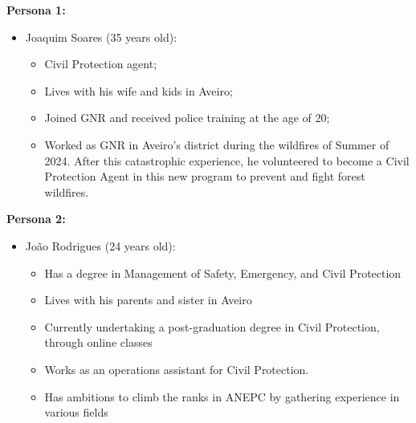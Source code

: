 \textbf{Persona 1:}
\begin{itemize}
    \item Joaquim Soares (35 years old):
    \begin{itemize}
    \item Civil Protection agent;
    \item Lives with his wife and kids in Aveiro;
    \item Joined GNR and received police training at the age of 20;
    \item Worked as GNR in Aveiro's district during the wildfires of 
    Summer of 2024. 
    After this catastrophic experience, he volunteered to become a
    Civil Protection Agent in this new program to prevent and fight forest wildfires. 
    \end{itemize}
\end{itemize} 

\textbf{Persona 2:}
\begin{itemize}
    \item João Rodrigues (24 years old):
    \begin{itemize}
    \item Has a degree in Management of
    Safety, Emergency, and Civil Protection
    \item Lives with his parents and sister in Aveiro
    \item Currently undertaking a post-graduation degree in Civil Protection,
    through online classes
    \item Works as an operations assistant for Civil Protection. 
    \item Has ambitions to
    climb the ranks in ANEPC by gathering experience in various fields
    \end{itemize}
\end{itemize}

